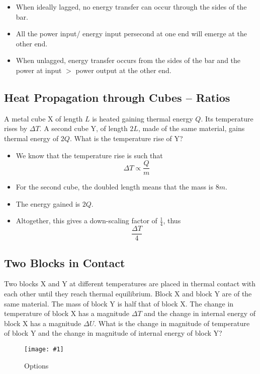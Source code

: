 \documentclass[a4paper,12pt]{article}
\newcommand{\img}[4]{\begin{center}
  \begin{figure}[H]
    \centering
    \texttt{[image: \#1]}
    \caption{#3}
    \label{fig:#4}
  \end{figure}
\end{center}}
\begin{document}
\begin{itemize}
  \item When ideally lagged, no energy transfer can occur through the sides of the bar.
  \item All the power input/ energy input persecond at one end will emerge at the other end.
  \item When unlagged, energy transfer occurs from the sides of the bar and the power at input $>$ power output at the other end.
\end{itemize}

\pagebreak

\subsection{Heat Propagation through Cubes -- Ratios}

A metal cube X of length $L$ is heated gaining thermal energy $Q$. Its temperature rises by $\Delta T$. A second cube Y, of length $2L$, made of the same material, gains thermal energy of $2Q$. What is the temperature rise of Y?

\begin{itemize}
  \item We know that the temperature rise is such that
        $$\Delta T \propto \frac{Q}{m}$$
  \item For the second cube, the doubled length means that the mass is $8m$.
  \item The energy gained is $2Q$.
  \item Altogether, this gives a down-scaling factor of $\frac{1}{4}$, thus $$\frac{\Delta T}{4}$$
\end{itemize}

\pagebreak

\subsection{Two Blocks in Contact}

Two blocks X and Y at different temperatures are placed in thermal contact with each other until they reach thermal equilibrium. Block X and block Y are
of the same material. The mass of block Y is half that of block X. The change in temperature of block X has a magnitude $\Delta T$ and the change in internal energy
of block X has a magnitude $\Delta U$. What is the change in magnitude of temperature of block Y and the change in magnitude of internal energy of block Y?

\img{ex/7.png}{0.5}{Options}{ex7}
\end{document}
